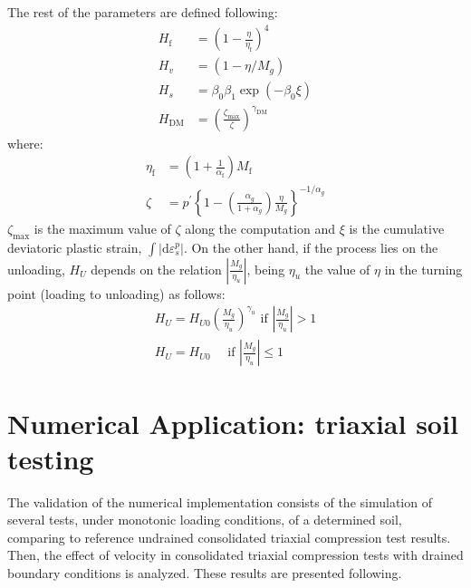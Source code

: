 \documentclass[preprint,12pt,a4paper]{elsarticle}
\begin{document}
The rest of the parameters are defined following:
\begin{equation}
\begin{aligned} H_{\mathrm{f}} &=\left(1-\frac{\eta}{\eta_{\mathrm{f}}}\right)^{4} \\ 
H_{v} &=\left(1-\eta / M_{g}\right) \\ 
H_{s} &=\beta_{0} \beta_{1} \exp \left(-\beta_{0} \xi\right) \\ 
H_{\mathrm{DM}} &=\left(\frac{\zeta_{\mathrm{max}}}{\zeta}\right)^{\gamma_{\mathrm{DM}}} \end{aligned}
\end{equation}
where:
\begin{equation}
\begin{aligned} 
\eta_{\mathrm{f}} &=\left(1+\frac{1}{\alpha_{\mathrm{f}}}\right) M_{\mathrm{f}} \\ 
\zeta &=p^{\prime}\left\{1-\left(\frac{\alpha_{g}}{1+\alpha_{g}}\right) \frac{\eta}{M_{g}}\right\}^{-1 / \alpha_{g}} \end{aligned}
\end{equation}
$\zeta_{\mathrm{max}}$ is the maximum value of $\zeta$ along the computation and $\xi$ is the cumulative deviatoric plastic strain, $\int\left|\mathrm{d} \varepsilon_{s}^{p}\right| $. On the other hand, if the process lies on the unloading, $H_U$ depends on the relation $\left|\frac{M_{g}}{\eta_{u}}\right|$, being $\eta_{u}$ the value of $\eta$ in the turning point (loading to unloading) as follows:
\begin{equation}
\begin{array}{c}{H_{U}=H_{U 0}\left(\frac{M_{g}}{\eta_{u}}\right)^{\gamma_{u}} \text { if }\left|\frac{M_{g}}{\eta_{u}}\right|>1} \\ 
{H_{U}=H_{U 0} \quad \text { if }\left|\frac{M_{g}}{\eta_{u}}\right| \leqslant 1}\end{array}
\end{equation}



\section{Numerical Application: triaxial soil testing}
\label{sec:3}
The validation of the numerical implementation consists of the simulation of several tests, under monotonic loading conditions, of a determined soil, comparing to reference undrained consolidated triaxial compression test results. Then, the effect of velocity in consolidated triaxial compression tests with drained boundary conditions is analyzed. These results are presented following.
\end{document}
